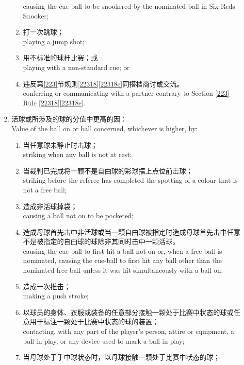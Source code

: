 \begin{enumerate}[label=(\alph*),start=1]
\begin{enumerate}[label=(\roman*)]
        causing the cue-ball to be snookered by the nominated ball in Six Reds Snooker;
        \item 打一次跳球；\\
        playing a jump shot;
        \item 用不标准的球杆比赛；或\\
        playing with a non-standard cue; or
        \item 违反第\ref{223}节规则\ref{22318}\ref{22318e}同搭档商讨或交流。\\
        conferring or communicating with a partner contrary to Section \ref{223} Rule \ref{22318}\ref{22318e}.
    \end{enumerate}
    \item \label{22311b}活球或所涉及的球的分值中更高的因：\\
    Value of the ball on or ball concerned, whichever is higher, by:
    \begin{enumerate}[label=(\roman*)]
        \item 当任意球未静止时击球；\\
        striking when any ball is not at rest;
        \item \label{22311bii}当裁判已完成将一颗不是自由球的彩球摆上点位前击球；\\
        striking before the referee has completed the spotting of a colour that is not a free ball;
        \item 造成非活球掉袋；\\
        causing a ball not on to be pocketed;
        \item 造成母球首先击中非活球或当一颗自由球被指定时造成母球首先击中任意不是被指定的自由球的球除非其同时击中一颗活球。\\
        causing the cue-ball to first hit a ball not on or, when a free ball is nominated, causing the cue-ball to first hit any ball other than the nominated free ball unless it was hit simultaneously with a ball on;
        \item 造成一次推击；\\
        making a push stroke;
        \item 以球员的身体、衣服或装备的任意部分接触一颗处于比赛中状态的球或任意用于标注一颗处于比赛中状态的球的装置；\\
        contacting, with any part of the player's person, attire or equipment, a ball in play, or any device used to mark a ball in play;
        \item 当母球处于手中球状态时，以母球接触一颗处于比赛中状态的球；\\

\end{enumerate}
\end{enumerate}
